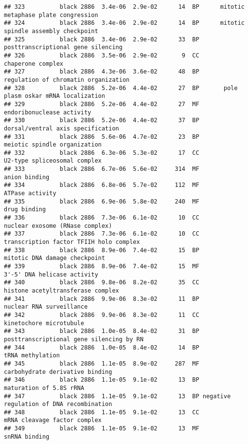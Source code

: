 \documentclass[]{article}
\begin{document}
\begin{verbatim}
## 323          black 2886  3.4e-06  2.9e-02      14  BP      mitotic metaphase plate congression
## 324          black 2886  3.4e-06  2.9e-02      14  BP      mitotic spindle assembly checkpoint
## 325          black 2886  3.4e-06  2.9e-02      33  BP       posttranscriptional gene silencing
## 326          black 2886  3.5e-06  2.9e-02       9  CC                        chaperone complex
## 327          black 2886  4.3e-06  3.6e-02      48  BP     regulation of chromatin organization
## 328          black 2886  5.2e-06  4.4e-02      27  BP       pole plasm oskar mRNA localization
## 329          black 2886  5.2e-06  4.4e-02      27  MF                endoribonuclease activity
## 330          black 2886  5.2e-06  4.4e-02      37  BP        dorsal/ventral axis specification
## 331          black 2886  5.6e-06  4.7e-02      23  BP             meiotic spindle organization
## 332          black 2886  6.3e-06  5.3e-02      17  CC             U2-type spliceosomal complex
## 333          black 2886  6.7e-06  5.6e-02     314  MF                            anion binding
## 334          black 2886  6.8e-06  5.7e-02     112  MF                          ATPase activity
## 335          black 2886  6.9e-06  5.8e-02     240  MF                             drug binding
## 336          black 2886  7.3e-06  6.1e-02      10  CC          nuclear exosome (RNase complex)
## 337          black 2886  7.3e-06  6.1e-02      10  CC  transcription factor TFIIH holo complex
## 338          black 2886  8.9e-06  7.4e-02      15  BP            mitotic DNA damage checkpoint
## 339          black 2886  8.9e-06  7.4e-02      15  MF              3'-5' DNA helicase activity
## 340          black 2886  9.8e-06  8.2e-02      35  CC        histone acetyltransferase complex
## 341          black 2886  9.9e-06  8.3e-02      11  BP                 nuclear RNA surveillance
## 342          black 2886  9.9e-06  8.3e-02      11  CC                  kinetochore microtubule
## 343          black 2886  1.0e-05  8.4e-02      31  BP posttranscriptional gene silencing by RN
## 344          black 2886  1.0e-05  8.4e-02      14  BP                         tRNA methylation
## 345          black 2886  1.1e-05  8.9e-02     287  MF          carbohydrate derivative binding
## 346          black 2886  1.1e-05  9.1e-02      13  BP                  maturation of 5.8S rRNA
## 347          black 2886  1.1e-05  9.1e-02      13  BP negative regulation of DNA recombination
## 348          black 2886  1.1e-05  9.1e-02      13  CC             mRNA cleavage factor complex
## 349          black 2886  1.1e-05  9.1e-02      13  MF                            snRNA binding

\end{verbatim}
\end{document}
